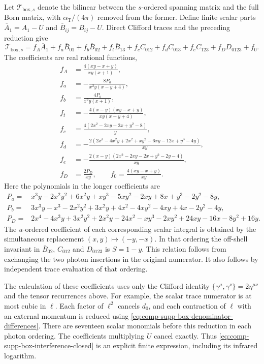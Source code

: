 Let $\mathcal T_{\mathrm{box},s}$ denote the bilinear between
the $s$-ordered spanning matrix and the full Born matrix, with
$\alpha_{\mathrm T}/(4\pi)$ removed from the former. Define finite
scalar parts $\overline A_1=A_1-U$ and
$\overline B_{ij}=B_{ij}-U$. Direct Clifford traces and the preceding
reduction give
\begin{equation}
 \mathcal T_{\mathrm{box},s}
 =f_A\overline A_1+f_a\overline B_{01}
 +f_b\overline B_{02}+f_t\overline B_{13}
 +f_c C_{012}+f_d C_{013}+f_e C_{123}
 +f_DD_{0123}+f_0.
 \label{eq:comp-supp-box-interference-closed}
\end{equation}
The coefficients are real rational functions,
\begin{align}
 f_A&=\frac{4(xy-x+y)}{xy(x+1)},\\
 f_a&=-\frac{8P_a}{x^2y(x-y+4)},\\
 f_b&=\frac{4P_b}{x^2y(x+1)},\\
 f_t&=-\frac{4(x-y)(xy-x+y)}{xy(x-y+4)},\\
 f_c&=\frac{4(2x^2-2xy-2x+y^2-8)}{y},\\
 f_d&=-\frac{2(2x^3-4x^2y+2x^2+xy^2-6xy-12x+y^3-4y)}{xy},\\
 f_e&=-\frac{2(x-y)(2x^2-2xy-2x+y^2-2y-4)}{xy},\\
 f_D&=\frac{2P_D}{xy},\qquad
 f_0=\frac{4(xy-x+y)}{xy}.
\end{align}
Here the polynomials in the longer coefficients are
\begin{align}
 P_a={}&x^3y-2x^2y^2+6x^2y+xy^3-5xy^2-2xy
                +8x+y^3-2y^2-8y,\\
 P_b={}&3x^3y-x^3-2x^2y^2+3x^2y+4x^2
                -4xy^2-4xy+4x-2y^2-4y,\\
 P_D={}&2x^4-4x^3y+3x^2y^2+2x^2y-24x^2
                -xy^3-2xy^2+24xy-16x-8y^2+16y.
\end{align}
The $u$-ordered coefficient of each corresponding scalar integral
is obtained by the simultaneous replacement
$(x,y)\mapsto(-y,-x)$. In that ordering the off-shell invariant
in $\overline B_{02}$, $C_{012}$ and $D_{0123}$ is $S=1-y$.
This relation follows from exchanging the two photon insertions
in the original numerator. It also follows by independent trace
evaluation of that ordering.

The calculation of these coefficients uses only the Clifford
identity $\{\gamma^\mu,\gamma^\nu\}=2\eta^{\mu\nu}$ and the tensor
recurrences above. For example, the scalar trace numerator is
at most cubic in $\ell$. Each factor of $\ell^2$ cancels $d_0$,
and each contraction of $\ell$ with an external momentum is
reduced using \eqref{eq:comp-supp-box-denominator-differences}.
There are seventeen scalar monomials before this reduction in
each photon ordering. The coefficients multiplying $U$ cancel
exactly. Thus \eqref{eq:comp-supp-box-interference-closed} is an
explicit finite expression, including its infrared logarithm.

